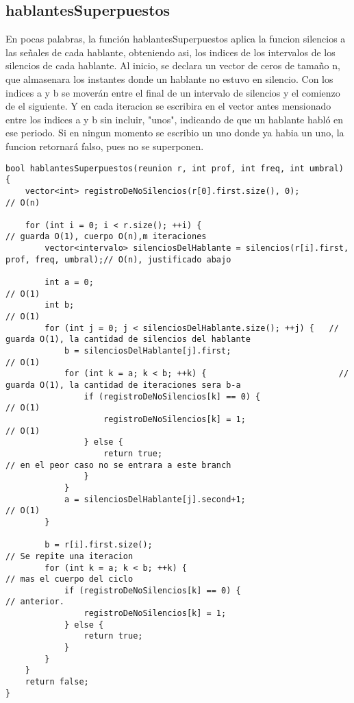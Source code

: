 \documentclass{article}
\begin{document}
\newpage
\subsection{hablantesSuperpuestos}
En pocas palabras, la función hablantesSuperpuestos aplica la funcion silencios a las señales de cada hablante,
obteniendo asi, los indices de los intervalos de los silencios de cada hablante.
Al inicio, se declara un vector de ceros de tamaño n, que almasenara los instantes donde un hablante no estuvo en
silencio. \newline
Con los indices a y b se moverán entre el final de un intervalo de silencios y el comienzo de el siguiente. Y en cada
iteracion se escribira en el vector antes mensionado entre los indices a y b sin incluir, "unos", indicando de que un
hablante habló en ese periodo. \newline
Si en ningun momento se escribio un uno donde ya habia un uno, la funcion retornará falso, pues no se superponen. \newline

\begin{lstlisting}
bool hablantesSuperpuestos(reunion r, int prof, int freq, int umbral) {
    vector<int> registroDeNoSilencios(r[0].first.size(), 0);                               // O(n)

    for (int i = 0; i < r.size(); ++i) {                                       // guarda O(1), cuerpo O(n),m iteraciones
        vector<intervalo> silenciosDelHablante = silencios(r[i].first, prof, freq, umbral);// O(n), justificado abajo

        int a = 0;                                                                         // O(1)
        int b;                                                                             // O(1)
        for (int j = 0; j < silenciosDelHablante.size(); ++j) {   // guarda O(1), la cantidad de silencios del hablante
            b = silenciosDelHablante[j].first;                                             // O(1)
            for (int k = a; k < b; ++k) {                           // guarda O(1), la cantidad de iteraciones sera b-a
                if (registroDeNoSilencios[k] == 0) {                                       // O(1)
                    registroDeNoSilencios[k] = 1;                                          // O(1)
                } else {
                    return true;                                          // en el peor caso no se entrara a este branch
                }
            }
            a = silenciosDelHablante[j].second+1;                                          // O(1)
        }

        b = r[i].first.size();                                                             // Se repite una iteracion
        for (int k = a; k < b; ++k) {                                                      // mas el cuerpo del ciclo
            if (registroDeNoSilencios[k] == 0) {                                           // anterior.
                registroDeNoSilencios[k] = 1;
            } else {
                return true;
            }
        }
    }
    return false;
}
\end{lstlisting}
\end{document}
